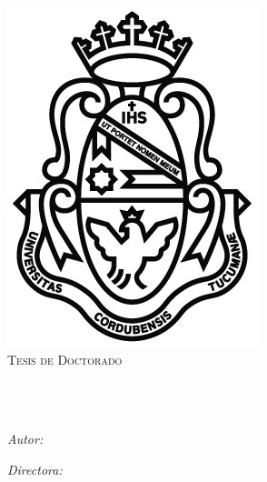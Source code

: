 \documentclass[
11pt, %
english, %
onehalfspacing, %
nolistspacing, %
headsepline, %
consistentlayout, %
]{MastersDoctoralThesis} %
\author{Cristian \textsc{Cardellino}} %
\begin{document}
\frontmatter %

\pagestyle{plain} %


\begin{titlepage}
\begin{center}

{\scshape\LARGE \univname\\\facname\par}\vspace{0.5cm} %
\includegraphics[scale=0.4]{images/logounc.jpg}\\[0.4cm] %
\textsc{\Large Tesis de Doctorado}\\[0.2cm] %

\HRule \\[0.4cm] %
{\huge \bfseries \ttitle\par}\vspace{0.4cm} %
\HRule \\[1cm] %
 
\begin{minipage}[t]{0.4\textwidth}
\begin{flushleft} \large
\emph{Autor:}\\
\href{https://crscardellino.github.io}{\authorname} %
\end{flushleft}
\end{minipage}
\begin{minipage}[t]{0.4\textwidth}
\begin{flushright} \large
\emph{Directora:} \\
\href{https://cs.famaf.unc.edu.ar/~laura/}{\supname} %
\end{flushright}
\end{minipage}\\[1cm]


\end{center}
\end{titlepage}
\end{document}

